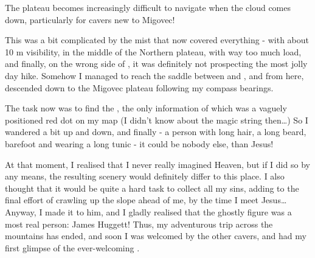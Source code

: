 \begin{marginfigure}
\checkoddpage \ifoddpage \forcerectofloat \else \forceversofloat \fi
\centering
 \caption{The plateau becomes increasingly difficult to navigate when the cloud comes down, particularly for cavers new to Migovec! }
 \label{plateau cloud gergely}
\end{marginfigure}

This was a bit complicated by the mist that now covered everything -
with about 10 m visibility, in the middle of the Northern plateau, with
way too much load, and finally, on the wrong side of , it was
definitely not prospecting the most jolly day hike. Somehow I managed to
reach the saddle between  and , and from here, descended down
to the Migovec plateau following my compass bearings.

The task now was to find the , the only information of which was a
vaguely positioned red dot on my map (I didn't know about the magic
string then\ldots{}) So I wandered a bit up and down, and finally  - a person with long hair, a long beard, barefoot and
wearing a long tunic - it could be nobody else, than Jesus! 

At that moment, I realised that I never really imagined Heaven, but if I
did so by any means, the resulting scenery would definitely differ to this
place. I also thought that it would be quite a hard task to collect all
my sins, adding to the final effort of crawling up the slope ahead of
me, by the time I meet Jesus\ldots{} Anyway, I made it to him, and I
gladly realised that the ghostly figure was a most real person: James
Huggett! Thus, my adventurous trip across the mountains has ended, and
soon I was welcomed by the other cavers, and had my first glimpse of the
ever-welcoming .

